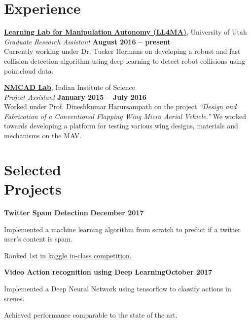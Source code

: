 \documentclass[letterpaper, margin, line]{resume}
\begin{document}
\begin{resume}
    \section{\mysidestyle Experience}

    \href{https://robot-learning.cs.utah.edu}{\textbf{Learning Lab for Manipulation Autonomy (LL4MA)}}, University of Utah \vspace{1pt}\\\vspace{1pt}%
    \textsl{Graduate Research Assistant} \hfill \textbf{August 2016 -- present}\\
	Currently working under Dr. Tucker Hermans on developing a robust and fast collision detection algorithm using deep learning to detect robot collisions using pointcloud data.

	

    \href{http://www.aero.iisc.ernet.in/~dinesh/web/}{\textbf{NMCAD Lab}}, Indian Institute of Science \vspace{1pt}\\\vspace{1pt}%
    \textsl{Project Assistant} \hfill \textbf{January 2015 -- July 2016}\\
    Worked under Prof. Dineshkumar Harursampath on the project \textit{``Design and Fabrication of a Conventional Flapping Wing Micro Aerial Vehicle.''} We worked towards developing a platform for testing various wing designs, materials and mechanisms on the MAV.

    
	\section{\mysidestyle Selected\\Projects}
	
	\textbf{Twitter Spam Detection} \hfill \textbf{December 2017}
	\begin{list2}
		\item Implemented a machine learning algorithm from scratch to predict if a twitter user's content is spam.
		\item Ranked 1st in \href{https://www.kaggle.com/c/uofu-ml-fall-2017}{kaggle in-class competition}.
	\end{list2}\vspace{-1.5mm}

	\textbf{Video Action recognition using Deep Learning}\hfill \textbf{October 2017}
	\begin{list2}
	\item Implemented a Deep Neural Network using tensorflow to classify actions in scenes.
	\item Achieved performance comparable to the state of the art.
	\end{list2}\vspace{-1.5mm}


\end{resume}
\end{document}
